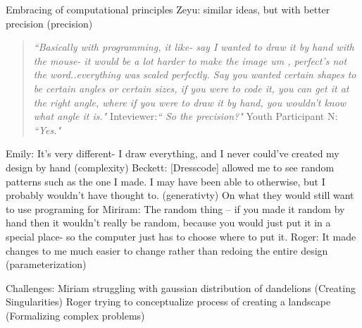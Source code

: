 \documentclass{sigchi}
\begin{document}
Embracing of computational principles
Zeyu: similar ideas, but with better precision (precision)
\begin{quotation}
 \textit{``Basically with programming, it like- say I wanted to draw it by hand with the mouse- it would be a lot harder to make the image um , perfect's not the word..everything was scaled perfectly. Say you wanted certain shapes to be certain angles or certain sizes, if you were to code it, you can get it at the right angle, where if you were to draw it by hand, you wouldn't know what angle it is."}
 Inteviewer:\textit{`` So the precision?"}
Youth Participant N: \textit{``Yes."}
\end{quotation}
Emily: It's very different- I draw everything, and I never could've created my design by hand (complexity)
Beckett: [Dresscode] allowed me to see random patterns such as the one I made. I may have been able to otherwise, but I probably wouldn't have thought to. (generativty)
On what they would still want to use programing for
Miriram: The random thing – if you made it random by hand then it wouldn't really be random, because you would just put it in a special place- so the computer just has to choose where to put it.
Roger: It made changes to me much easier to change rather than redoing the entire design (parameterization)

Challenges:
Miriam struggling with gaussian distribution of dandelions (Creating Singularities)
Roger trying to conceptualize process of creating a landscape (Formalizing complex problems)
\end{document}
